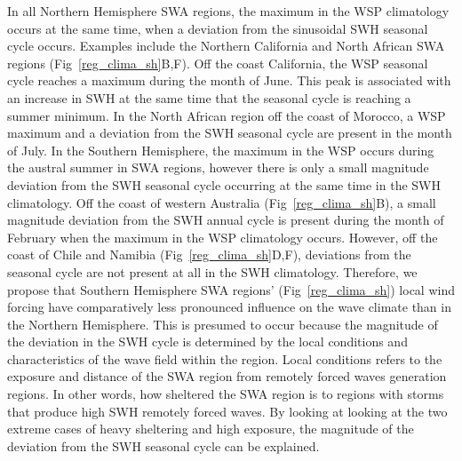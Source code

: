 \documentclass[draft,linenumbers]{agujournal2018}
\begin{document}
In all Northern Hemisphere SWA regions, the maximum in the WSP climatology occurs at the same time, when a deviation from the sinusoidal SWH seasonal cycle occurs. Examples include the Northern California and North African SWA regions (Fig~\ref{reg_clima_sh}B,F). Off the coast California, the WSP seasonal cycle reaches a maximum during the month of June. This peak is associated with an increase in SWH at the same time that the seasonal cycle is reaching a summer minimum. In the North African region off the coast of Morocco, a WSP maximum and a deviation from the SWH seasonal cycle are present in the month of July. In the Southern Hemisphere, the maximum in the WSP occurs during the austral summer in SWA regions, however there is only a small magnitude deviation from the SWH seasonal cycle occurring at the same time in the SWH climatology. Off the coast of western Australia (Fig~\ref{reg_clima_sh}B), a small magnitude deviation from the SWH annual cycle is present during the month of February when the maximum in the WSP climatology occurs. However, off the coast of Chile and Namibia (Fig~\ref{reg_clima_sh}D,F), deviations from the seasonal cycle are not present at all in the SWH climatology. Therefore, we propose that Southern Hemisphere SWA regions' (Fig~\ref{reg_clima_sh}) local wind forcing have comparatively less pronounced influence on the wave climate than in the Northern Hemisphere. This is presumed to occur because the magnitude of the deviation in the SWH cycle is determined by the local conditions and characteristics of the wave field within the region. Local conditions refers to the exposure and distance of the SWA region from remotely forced waves generation regions. In other words, how sheltered the SWA region is to regions with storms that produce high SWH remotely forced waves. By looking at looking at the two extreme cases of heavy sheltering and high exposure, the magnitude of the deviation from the SWH seasonal cycle can be explained. 
\end{document}

